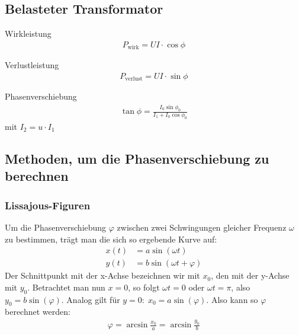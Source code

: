 \documentclass[12pt,a4paper,titlepage,headinclude,bibtotoc]{scrartcl}
\begin{document}
\subsection{Belasteter Transformator}
Wirkleistung
\begin{align}
	P_\text{wirk}=UI\cdot\cos\phi
\end{align}

Verlustleistung
\begin{align}
	P_\text{verlust}=UI\cdot\sin\phi
\end{align}

Phasenverschiebung
\begin{align}
	\tan\phi=\frac{I_0 \sin\phi_0}{I_1+I_0\cos\phi_0}
	\label{eq:phase_theo}
\end{align}
mit $I_2=u\cdot I_1$

\subsection{Methoden, um die Phasenverschiebung zu berechnen}
\subsubsection{Lissajous-Figuren}
Um die Phasenverschiebung $\varphi$ zwischen zwei Schwingungen gleicher Frequenz $\omega$ zu bestimmen, trägt man die sich so ergebende Kurve auf:
\begin{align*}
	x(t)&=a\sin(\omega t)\\
	y(t)&=b\sin(\omega t + \varphi)
\end{align*}
Der Schnittpunkt mit der x-Achse bezeichnen wir mit $x_0$, den mit der y-Achse mit $y_0$.
Betrachtet man nun $x=0$, so folgt $\omega t=0$ oder $\omega t=\pi$, also $y_0=b \sin(\varphi)$.
Analog gilt für $y=0:\;x_0=a\sin(\varphi)$.
Also kann so $\varphi$ berechnet werden:
\begin{align}
	\varphi=\arcsin\frac{x_0}{a}=\arcsin\frac{y_0}{b}
	\label{eq:lissajous}
\end{align}
\end{document}
